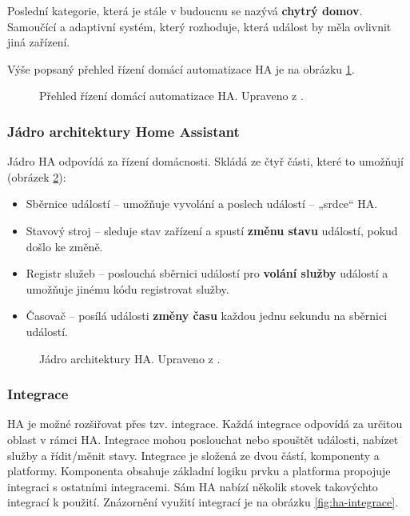 Poslední kategorie, která je stále v budoucnu se nazývá \textbf{chytrý domov}. Samoučící a adaptivní systém, který rozhoduje, která událost by měla ovlivnit jiná zařízení.

Výše popsaný přehled řízení domácí automatizace HA je na obrázku \ref{fig:ha-prehled-domaci-autmatizace}.


\begin{figure}[H]
    \centering
    \def\svgwidth{\columnwidth}
    
    \caption[Přehled řízení domácí automatizace HA.]{Přehled řízení domácí automatizace HA. Upraveno z \cite{home-assistant-architektura}.}
    \label{fig:ha-prehled-domaci-autmatizace}
\end{figure}

\subsubsection{Jádro architektury Home Assistant}
Jádro HA odpovídá za řízení domácnosti. Skládá ze čtyř části, které to umožňují (obrázek \ref{fig:ha-jadro-architektury}):

\begin{itemize}
\item Sběrnice událostí – umožňuje vyvolání a poslech událostí – „srdce“ HA.
\item Stavový stroj – sleduje stav zařízení a spustí \textbf{změnu stavu} událostí, pokud došlo ke změně.
\item  Registr služeb – poslouchá sběrnici událostí pro \textbf{volání služby} událostí a umožňuje jinému kódu registrovat služby.
\item Časovač – posílá události \textbf{změny času} každou jednu sekundu na sběrnici událostí.
\end{itemize}

\begin{figure}[H]
    \centering
    \def\svgwidth{\columnwidth}
    
    \caption[Jádro architektury HA.]{Jádro architektury HA. Upraveno z \cite{home-assistant-architektura}.}
    \label{fig:ha-jadro-architektury}
\end{figure}

\subsubsection{Integrace}
HA je možné rozšiřovat přes tzv. integrace. Každá integrace odpovídá za určitou oblast v rámci HA. Integrace mohou poslouchat nebo spouštět  události, nabízet služby a řídit/měnit stavy.  Integrace je složená ze dvou částí, komponenty a platformy. Komponenta obsahuje základní logiku prvku a platforma propojuje integraci s ostatními integracemi. Sám HA nabízí několik stovek takovýchto integrací k použití. Znázornění využití integrací je na obrázku \ref{fig:ha-integrace}.

